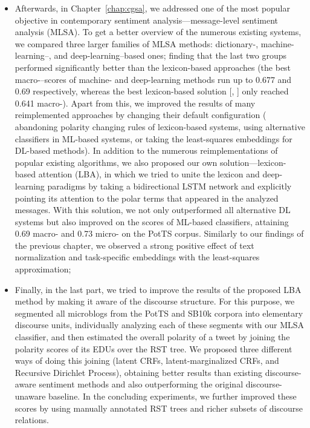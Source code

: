 \begin{itemize}
\item Afterwards, in Chapter~\ref{chap:cgsa}, we addressed one of the
  most popular objective in contemporary sentiment
  analysis---message-level sentiment analysis (MLSA).  To get a better
  overview of the numerous existing systems, we compared three larger
  families of MLSA methods: dictionary-, machine-learning--, and
  deep-learning--based ones; finding that the last two groups
  performed significantly better than the lexicon-based approaches
  (the best macro-\F{}--scores of machine- and deep-learning methods
  run up to 0.677 and 0.69 respectively, whereas the best
  lexicon-based solution [\citeauthor{Hu:04}, \citeyear{Hu:04}] only
  reached 0.641 macro-\F{}).  Apart from this, we improved the results
  of many reimplemented approaches by changing their default
  configuration (\eg{} abandoning polarity changing rules of
  lexicon-based systems, using alternative classifiers in ML-based
  systems, or taking the least-squares embeddings for DL-based
  methods).  In addition to the numerous reimplementations of popular
  existing algorithms, we also proposed our own
  solution---lexicon-based attention (LBA), in which we tried to unite
  the lexicon and deep-learning paradigms by taking a bidirectional
  LSTM network and explicitly pointing its attention to the polar
  terms that appeared in the analyzed messages.  With this solution,
  we not only outperformed all alternative DL systems but also
  improved on the scores of ML-based classifiers, attaining 0.69
  macro-\F{} and 0.73 micro-\F{} on the PotTS corpus.  Similarly to
  our findings of the previous chapter, we observed a strong positive
  effect of text normalization and task-specific embeddings with the
  least-squares approximation;

\item Finally, in the last part, we tried to improve the results of
  the proposed LBA method by making it aware of the discourse
  structure.  For this purpose, we segmented all microblogs from the
  PotTS and SB10k corpora into elementary discourse units,
  individually analyzing each of these segments with our MLSA
  classifier, and then estimated the overall polarity of a tweet by
  joining the polarity scores of its EDUs over the RST tree.  We
  proposed three different ways of doing this joining (latent CRFs,
  latent-marginalized CRFs, and Recursive Dirichlet Process),
  obtaining better results than existing discourse-aware sentiment
  methods and also outperforming the original discourse-unaware
  baseline.  In the concluding experiments, we further improved these
  scores by using manually annotated RST trees and richer subsets of
  discourse relations.
\end{itemize}


